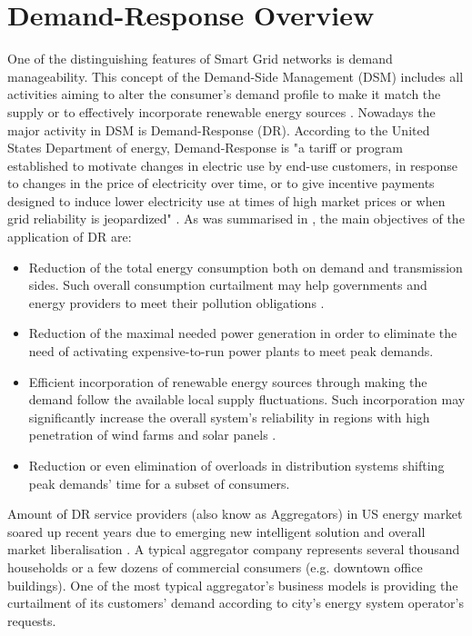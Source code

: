 \section{Demand-Response Overview}


One of the distinguishing features of Smart Grid networks is demand manageability. This concept of the Demand-Side Management (DSM) includes all activities aiming to alter the consumer's demand profile to make it match the supply or to effectively incorporate renewable energy sources \cite{Alizadeh2012}. Nowadays the major activity in DSM is Demand-Response (DR)\cite{Palensky2011}. According to the United States Department of energy, Demand-Response is "a tariff or program established to motivate changes in electric use by end-use customers, in response to changes in the price of electricity over time, or to give incentive payments designed to induce lower electricity use at times of high market prices or when grid reliability is jeopardized" \cite{DepartmentofEnergyUSA2006}. As was summarised in \cite{Vardakas2015}, the main objectives of the application of DR are:
\begin{itemize}
    \item Reduction of the total energy consumption both on demand and transmission sides. Such overall consumption curtailment may help governments and energy providers to meet their pollution obligations \cite{DepartmentofEnergyUSA2006, Shishlov2016, UnitedNations/FrameworkConventiononClimateChange2015}.
    \item Reduction of the maximal needed power generation in order to eliminate the need of activating expensive-to-run power plants to meet peak demands. 
    \item Efficient incorporation of renewable energy sources through making the demand follow the available local supply fluctuations. Such incorporation may significantly increase the overall system's reliability in regions with high penetration of wind farms and solar panels \cite{Santacana2010}. 
    \item Reduction or even elimination of overloads in distribution systems shifting peak demands' time for a subset of consumers.
\end{itemize} 

Amount of DR service providers (also know as Aggregators) in US energy market soared up recent years due to emerging new intelligent solution and overall market liberalisation  . A typical aggregator company represents several thousand households or a few dozens of commercial consumers (e.g. downtown office buildings).  One of the most typical aggregator's business models is providing the curtailment of its customers' demand according to city's energy system operator's requests.      

